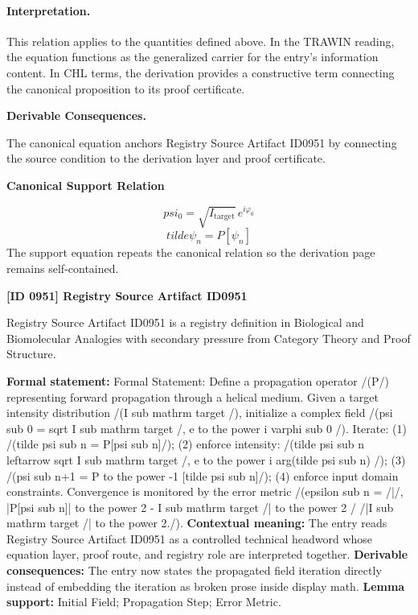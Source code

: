 \paragraph{Interpretation.}
This relation applies to the quantities defined above. In the TRAWIN reading, the equation functions as the generalized carrier for the entry’s information content. In CHL terms, the derivation provides a constructive term connecting the canonical proposition to its proof certificate.

\par\vspace{0.35em}
\noindent\textbf{Derivable Consequences.}\quad
\begingroup
\footnotesize
\raggedright
The canonical equation anchors Registry Source Artifact ID0951 by connecting the source condition to the derivation layer and proof certificate.
\par\endgroup

\noindent\textbf{Canonical Support Relation}\par
\[
psi_0 = \sqrt{I_{\mathrm{target}}}\,e^{i\varphi_0}
\]
\[
tilde{\psi}_n = P[\psi_n]
\]
\noindent The support equation repeats the canonical relation so the derivation page remains self-contained.\par

\clearpage
\noindent\textbf{[ID 0951] Registry Source Artifact ID0951}\par
\vspace{0.35em}
\begingroup\small
{}
Registry Source Artifact ID0951 is a registry definition in Biological and Biomolecular Analogies with secondary pressure from Category Theory and Proof Structure.

\begingroup\footnotesize\setlength{\emergencystretch}{3em}\sloppy
\textbf{Formal statement:} Formal Statement: Define a propagation operator /(P/) representing forward propagation through a helical medium. Given a target intensity distribution /(I sub mathrm target /), initialize a complex field /(psi sub 0 = sqrt I sub mathrm target /, e to the power i varphi sub 0 /). Iterate: (1) /(tilde psi sub n = P[psi sub n]/); (2) enforce intensity: /(tilde psi sub n leftarrow sqrt I sub mathrm target /, e to the power i arg(tilde psi sub n) /); (3) /(psi sub n+1 = P to the power -1 [tilde psi sub n]/); (4) enforce input domain constraints. Convergence is monitored by the error metric /(epsilon sub n = /|/, |P[psi sub n]| to the power 2 - I sub mathrm target /| to the power 2 / /|I sub mathrm target /| to the power 2./). \textbf{Contextual meaning:} The entry reads Registry Source Artifact ID0951 as a controlled technical headword whose equation layer, proof route, and registry role are interpreted together. \textbf{Derivable consequences:} The entry now states the propagated field iteration directly instead of embedding the iteration as broken prose inside display math. \textbf{Lemma support:} Initial Field; Propagation Step; Error Metric.\par
\endgroup

